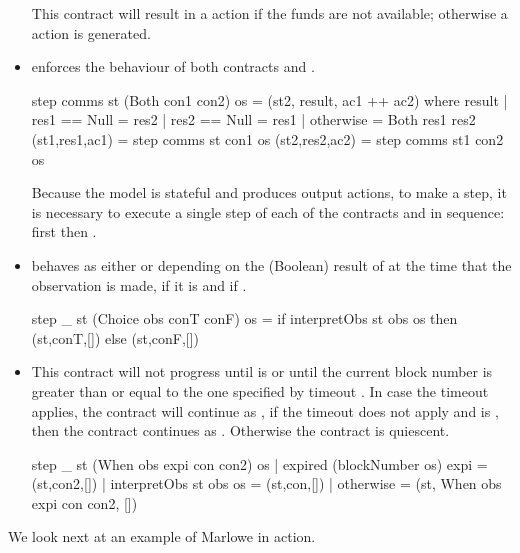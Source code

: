 \documentclass[runningheads]{llncs}
\begin{document}
\begin{itemize}
This contract will result in a  action if the funds are not available; otherwise a 
 action is generated.

\medskip
\noindent
\item {} enforces the behaviour of both contracts  and 
. 
\begin{haskellcode}
step comms st (Both con1 con2) os =
    (st2, result, ac1 ++ ac2)
    where
        result | res1 == Null = res2
               | res2 == Null = res1
               | otherwise = Both res1 res2
        (st1,res1,ac1) = step comms st con1 os
        (st2,res2,ac2) = step comms st1 con2 os
\end{haskellcode}
Because the model is stateful and produces output actions, to make a step, it is necessary to execute a single step of 
each of  the contracts  and  in sequence: first  then 
.

\medskip
\noindent
\item {} behaves as either  or  depending on 
the 
(Boolean) result of  at the time that the observation is made,  if it is 
 and  if .

\begin{haskellcode}
step _ st (Choice obs conT conF) os =
    if interpretObs st obs os
        then (st,conT,[])
        else (st,conF,[])
\end{haskellcode}

\medskip
\noindent
\item {} This contract will not progress until  is 
 or until the current block number is greater than or equal to the one specified by timeout 
. In case the timeout applies, the contract will continue as , if the timeout 
does not apply and  is , then the contract continues as . 
Otherwise the contract is quiescent.

\begin{haskellcode}
step _ st (When obs expi con con2) os
  | expired (blockNumber os) expi = (st,con2,[])
  | interpretObs st obs os = (st,con,[])
  | otherwise = (st, When obs expi con con2, [])
  \end{haskellcode}
\end{itemize}
We look next at an example of Marlowe in action.
\end{document}
